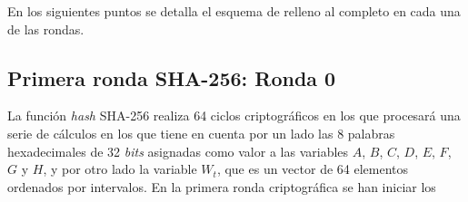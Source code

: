 \documentclass{article}
\begin{document}
        En los siguientes puntos se detalla el esquema de relleno al completo en cada una de las rondas.
        
        \subsection{Primera ronda SHA-256: Ronda 0}
        La función \textit{hash} SHA-256 realiza 64 ciclos criptográficos en los que procesará una serie de cálculos en los que tiene en cuenta por un lado las 8 palabras hexadecimales de 32 \textit{bits} asignadas como valor a las variables $A$, $B$, $C$, $D$, $E$, $F$, $G$ y $H$, y por otro lado la variable $W_t$, que es un vector de 64 elementos ordenados por intervalos. En la primera ronda criptográfica se han iniciar los
        
        \vspace{3mm}
        
\end{document}
